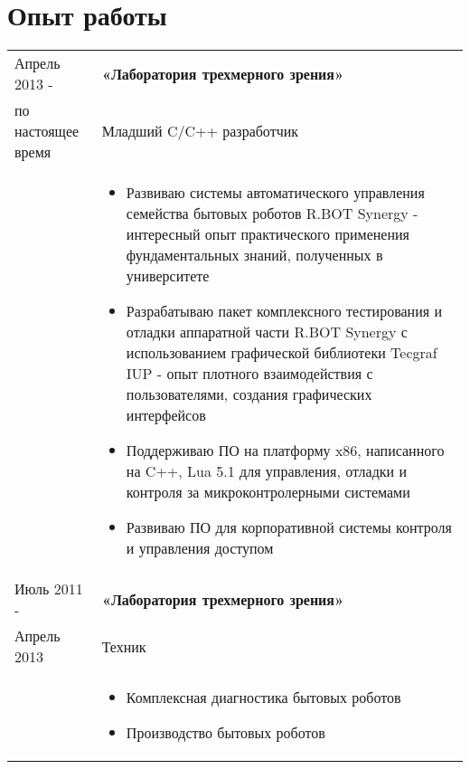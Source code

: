 \documentclass[a4paper, 11pt]{article}
\begin{document}
\section{Опыт работы}
\begin{tabular}{p{25mm}|p{110mm}}
    Апрель 2013 -       & \textbf{«Лаборатория трехмерного зрения»}                 \\
    по настоящее время  & Младший C/C++ разработчик                                 \\
                        &
    \begin{itemize}
        \item   Развиваю системы автоматического управления семейства бытовых
                роботов R.BOT Synergy - интересный опыт практического применения
                фундаментальных знаний, полученных в университете
        \item   Разрабатываю пакет комплексного тестирования и отладки аппаратной
                части R.BOT Synergy с использованием графической библиотеки
                Tecgraf IUP - опыт плотного взаимодействия с пользователями,
                создания графических интерфейсов
        \item   Поддерживаю ПО на платформу x86, написанного на C++, Lua 5.1
                для управления, отладки и контроля за микроконтролерными системами
        \item   Развиваю ПО для корпоративной системы контроля и управления
                доступом
    \end{itemize}                                                                   \\

    Июль 2011 - & \textbf{«Лаборатория трехмерного зрения»}                         \\
    Апрель 2013 & Техник                                                            \\
                &
    \begin{itemize}
        \item   Комплексная диагностика бытовых роботов
        \item   Производство бытовых роботов
    \end{itemize}                                                                   \\
\end{tabular}
\end{document}
